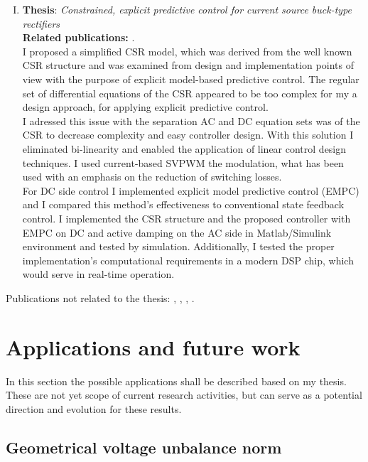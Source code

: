 \begin{enumerate}[I.)]
		\item\textbf{Thesis}: \emph{Constrained, explicit predictive control for current source buck-type rectifiers}\\
        \textbf{Related publications:} \cite{neukirchner2020constrained}.\\
    I proposed a simplified CSR model, which was derived from the well known CSR structure and was examined from design and implementation points of view with the purpose of explicit model-based predictive control. The regular set of differential equations of the CSR appeared to be too complex for my a design approach, for applying explicit predictive control. \\
		I adressed this issue with the separation AC and DC equation sets was of the CSR to decrease complexity and easy controller design. With this solution I eliminated bi-linearity and enabled the application of linear control design techniques. I used current-based SVPWM the modulation, what has been used with an emphasis on the reduction of switching losses. \\
		For DC side control I implemented explicit model predictive control (EMPC) and I compared this method's effectiveness to conventional state feedback control. I implemented the CSR structure and the proposed controller with EMPC on DC and active damping on the AC side in Matlab/Simulink environment and tested by simulation. Additionally, I tested the proper implementation's computational requirements in a modern DSP chip, which would serve in real-time operation.\\
	
\end{enumerate}

Publications not related to the thesis:  \cite{neukirchner2011modeling}, \cite{neukirchner2014quasi}, \cite{gollei2014measurement}, \cite{neukirchner2016modelling}.


		\section{Applications and future work}
		
		In this section the possible applications shall be described based on my thesis. These are not yet scope of current research activities, but can serve as a potential direction and evolution for these results.
		
		\subsection{Geometrical voltage unbalance norm}
		
